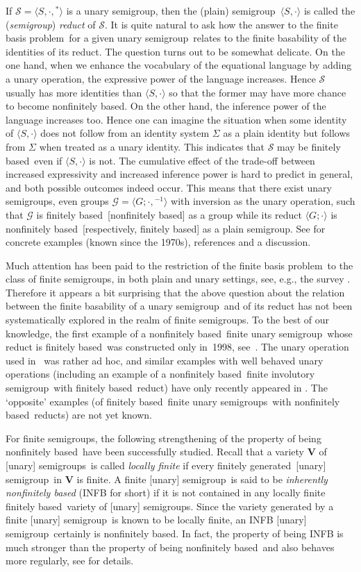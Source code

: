 \documentclass[smallextended]{svjour3}
\newcommand{\sgp}{semi\-group}
\newcommand{\sgps}{semi\-groups}
\newcommand{\fis}{finite involutory semi\-group}
\newcommand{\fss}{finite \sgps}
\newcommand{\fus}{finite unary \sgp}
\newcommand{\fuss}{finite unary \sgps}
\newcommand{\fb}{finitely based}
\newcommand{\fbp}{finite basis problem}
\newcommand{\fg}{finitely generated}
\newcommand{\nfb}{non\-finitely based}
\newcommand{\infb}{inherently non\-finitely based}
\begin{document}
If $\mathcal{S}=\langle S,\cdot,{}^*\rangle$ is a unary \sgp, then the (plain) \sgp\ $\langle S,\cdot\rangle$ is called the (\emph{\sgp})
\emph{reduct} of $\mathcal{S}$. It is quite natural to ask how the answer to the \fbp\ for a given unary \sgp\ relates to the finite
basability of the identities of its reduct. The question turns out to be somewhat delicate. On the one hand, when we enhance the vocabulary
of the equational language by adding a unary operation, the expressive power of the language increases. Hence $\mathcal{S}$ usually has
more identities than $\langle S,\cdot\rangle$ so that the former may have more chance to become \nfb. On the other hand, the inference
power of the language increases too. Hence one can imagine the situation when some identity of $\langle S,\cdot\rangle$  does not follow
from an identity system $\Sigma$ as a plain identity but follows from $\Sigma$ when treated as a unary identity. This indicates that
$\mathcal{S}$ may be \fb\ even if $\langle S,\cdot\rangle$ is not. The cumulative effect of the trade-off between increased expressivity
and increased inference power is hard to predict in general, and both possible outcomes indeed occur. This means that there exist unary
\sgps, even groups $\mathcal{G}=\langle G;\cdot,{}^{-1}\rangle$ with inversion as the unary operation, such that $\mathcal{G}$ is \fb\
[\nfb] as a group while its reduct $\langle G;\cdot\rangle$ is \nfb\ [respectively, \fb] as a plain \sgp. See \cite[Section~2]{Volkov:2001}
for concrete examples (known since the 1970s), references and a discussion.

Much attention has been paid to the restriction of the \fbp\ to the class of \fss, in both plain and unary settings, see, e.g., the survey
\cite{Volkov:2001}. Therefore it appears a bit surprising that the above question about the relation between the finite basability of a
unary \sgp\ and of its reduct has not been systematically explored in the realm of \fss. To the best of our knowledge, the first example of
a \nfb\ \fus\ whose reduct is \fb\ was constructed only in~1998, see~\cite{Lawrence&Willard:1998}. The unary operation used
in~\cite{Lawrence&Willard:1998} was rather ad hoc, and similar examples with well behaved unary operations (including an example of a \nfb\
\fis\ with \fb\ reduct) have only recently appeared in \cite{Jackson&Volkov:2010}. The `opposite' examples (of \fb\ \fuss\ with \nfb\
reducts) are not yet known.

For \fss, the following strengthening of the property of being \nfb\ have been successfully studied. Recall that a variety $\mathbf{V}$ of
[unary] \sgps\ is called \emph{locally finite} if every \fg\ [unary] \sgp\ in $\mathbf{V}$ is finite. A finite [unary] \sgp\ is said to be
\emph{\infb} (INFB for short) if it is not contained in any locally finite \fb\ variety of [unary] \sgps. Since the variety generated by a
finite [unary] \sgp\ is known to be locally finite, an INFB [unary] \sgp\ certainly is \nfb. In fact, the property of being INFB is much
stronger than the property of being \nfb\ and also behaves more regularly, see \cite{Volkov:2001} for details.
\end{document}
